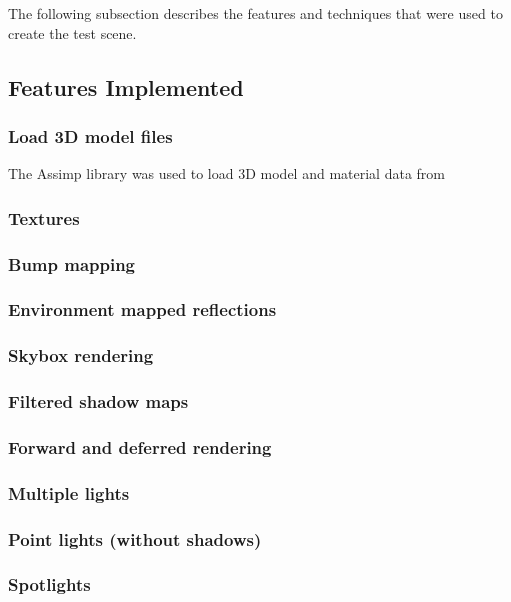 \documentclass[11pt]{scrartcl} %
\begin{document}

    The following subsection describes the features and techniques that were used to create the test scene.

    \subsection{Features Implemented}

        \subsubsection{Load 3D model files}

            The Assimp library was used to load 3D model and material data from

        \subsubsection{Textures}
        \subsubsection{Bump mapping}
        \subsubsection{Environment mapped reflections}
        \subsubsection{Skybox rendering}
        \subsubsection{Filtered shadow maps}
        \subsubsection{Forward and deferred rendering}
        \subsubsection{Multiple lights}
        \subsubsection{Point lights (without shadows)}
        \subsubsection{Spotlights}
\end{document}

